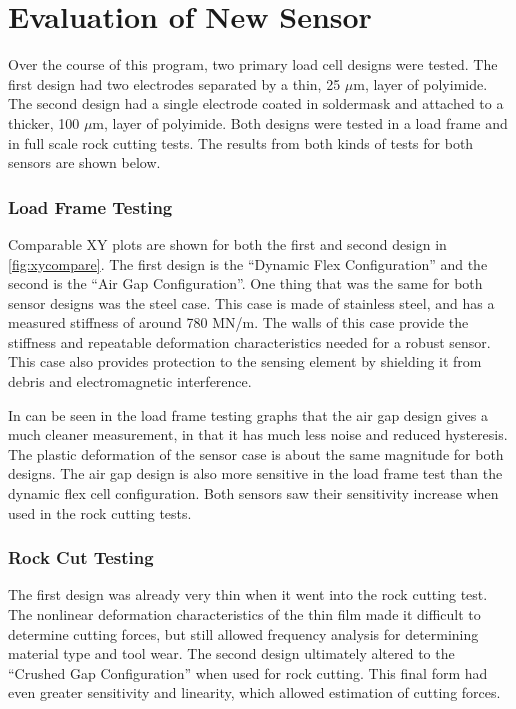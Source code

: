 \chapter{Evaluation of New Sensor
\label{chap:8}}

Over the course of this program, two primary load cell designs were tested.
The first design had two electrodes separated by a thin, 25 $\mu$m, layer of polyimide.
The second design had a single electrode coated in soldermask 
and attached to a thicker, 100 $\mu$m, layer of polyimide.
Both designs were tested in a load frame and in full scale rock cutting tests.
The results from both kinds of tests for both sensors are shown below.

\subsection{Load Frame Testing
\label{compare1}}

Comparable XY plots are shown for both the first and second design
in \ref{fig:xycompare}. The first design is the ``Dynamic Flex Configuration'' 
and the second is the ``Air Gap Configuration''.
One thing that was the same for both sensor designs was the steel case. This case
is made of stainless steel, and has a measured stiffness of around 780 MN/m. 
The walls of this case provide the stiffness and repeatable deformation characteristics
needed for a robust sensor. This case also provides protection to the sensing element by
shielding it from debris and electromagnetic interference.

In can be seen in the load frame testing graphs that the air gap design
gives a much cleaner measurement, in that it has much less noise and reduced hysteresis.
The plastic deformation of the sensor case is about the same magnitude for both designs.
The air gap design is also more sensitive in the load frame test than the dynamic flex cell configuration.
Both sensors saw their sensitivity increase when used in the rock cutting tests.

\subsection{Rock Cut Testing
\label{compare2}}

The first design was already very thin when it went into the rock cutting test.
The nonlinear deformation characteristics of the thin film made it difficult to determine
cutting forces, but still allowed frequency analysis for determining material type and tool wear.
The second design ultimately altered to the ``Crushed Gap Configuration'' when used for rock cutting.
This final form had even greater sensitivity and linearity, which allowed estimation of cutting forces.

